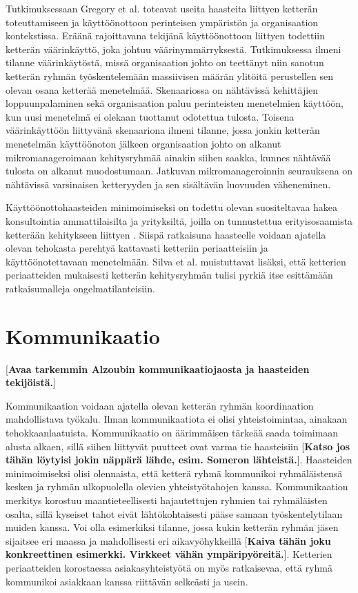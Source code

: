 Tutkimuksessaan Gregory et al. \cite{GREGORY201692} toteavat useita haasteita liittyen ketterän toteuttamiseen ja käyttöönottoon perinteisen ympäristön ja organisaation kontekstissa. Eräänä rajoittavana tekijänä käyttöönottoon liittyen todettiin ketterän väärinkäyttö, joka johtuu väärinymmärryksestä. Tutkimuksessa ilmeni tilanne väärinkäytöstä, missä organisaation johto on teettänyt niin sanotun ketterän ryhmän työskentelemään massiivisen määrän ylitöitä perustellen sen olevan osana ketterää menetelmää. Skenaariossa on nähtävissä kehittäjien loppuunpalaminen sekä organisaation paluu perinteisten menetelmien käyttöön, kun uusi menetelmä ei olekaan tuottanut odotettua tulosta. Toisena väärinkäyttöön liittyvänä skenaariona ilmeni tilanne, jossa jonkin ketterän menetelmän käyttöönoton jälkeen organisaation johto on alkanut mikromanageroimaan kehitysryhmää ainakin siihen saakka, kunnes nähtävää tulosta on alkanut muodostumaan. Jatkuvan mikromanageroinnin seurauksena on nähtävissä varsinaisen ketteryyden ja sen sisältävän luovuuden väheneminen.

Käyttöönottohaasteiden minimoimiseksi on todettu olevan suositeltavaa hakea konsultointia ammattilaisilta ja yrityksiltä, joilla on tunnustettua erityisosaamista ketterään kehitykseen liittyen \cite{SELLERISILVA201520}. Siispä ratkaisuna haasteelle voidaan ajatella olevan tehokasta perehtyä kattavasti ketteriin periaatteisiin ja käyttöönotettavaan menetelmään. Silva et al. \cite{SELLERISILVA201520} muistuttavat lisäksi, että ketterien periaatteiden mukaisesti ketterän kehitysryhmän tulisi pyrkiä itse esittämään ratkaisumalleja ongelmatilanteisiin.

\section{Kommunikaatio}

[\textbf{Avaa tarkemmin Alzoubin kommunikaatiojaosta ja haasteiden tekijöistä.}]

Kommunikaation voidaan ajatella olevan ketterän ryhmän koordinaation mahdollistava työkalu. Ilman kommunikaatiota ei olisi yhteistoimintaa, ainakaan tehokkaanlaatuista. Kommunikaatio on äärimmäisen tärkeää saada toimimaan alusta alkaen, sillä siihen liittyvät puutteet ovat varma tie haasteisiin [\textbf{Katso jos tähän löytyisi jokin näppärä lähde, esim. Someron lähteistä.}]. Haasteiden minimoimiseksi olisi olennaista, että ketterä ryhmä kommunikoi ryhmäläistensä kesken ja ryhmän ulkopuolella olevien yhteistyötahojen kanssa. Kommunikaation merkitys korostuu maantieteellisesti hajautettujen ryhmien tai ryhmäläisten osalta, sillä kyseiset tahot eivät lähtökohtaisesti pääse samaan työskentelytilaan muiden kanssa. Voi olla esimerkiksi tilanne, jossa kukin ketterän ryhmän jäsen sijaitsee eri maassa ja mahdollisesti eri aikavyöhykkeillä [\textbf{Kaiva tähän joku konkreettinen esimerkki. Virkkeet vähän ympäripyöreitä.}]. Ketterien periaatteiden korostaessa asiakasyhteistyötä on myös ratkaisevaa, että ryhmä kommunikoi asiakkaan kanssa riittävän selkeästi ja usein.

